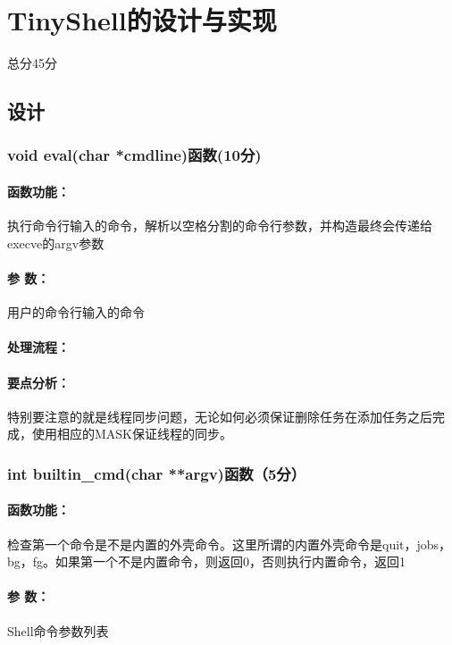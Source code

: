 \section{TinyShell的设计与实现}
\begin{center}
    总分45分
\end{center}

\subsection{设计}

\subsubsection{void eval(char *cmdline)函数(10分)}

\paragraph{函数功能：}执行命令行输入的命令，解析以空格分割的命令行参数，并构造最终会传递给execve的argv参数
\paragraph{参   数：}用户的命令行输入的命令
\paragraph{处理流程：}

\paragraph{要点分析：}特别要注意的就是线程同步问题，无论如何必须保证删除任务在添加任务之后完成，使用相应的MASK保证线程的同步。

\subsubsection{int builtin\_cmd(char **argv)函数（5分）}

\paragraph{函数功能：}检查第一个命令是不是内置的外壳命令。这里所谓的内置外壳命令是quit，jobs，bg，fg。如果第一个不是内置命令，则返回0，否则执行内置命令，返回1
\paragraph{参   数：}Shell命令参数列表
